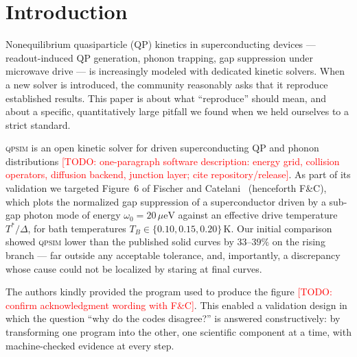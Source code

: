 \documentclass[reprint,amsmath,amssymb,aps,prapplied,nofootinbib]{revtex4-2}
\newcommand{\todo}[1]{\textcolor{red}{[TODO: #1]}}
\newcommand{\qpsim}{\textsc{qpsim}}
\newcommand{\ueV}{\,\mu\mathrm{eV}}
\begin{document}
\maketitle

\section{Introduction}

Nonequilibrium quasiparticle (QP) kinetics in superconducting devices ---
readout-induced QP generation, phonon trapping, gap suppression under
microwave drive --- is increasingly modeled with dedicated kinetic
solvers.  When a new solver is introduced, the community reasonably asks
that it reproduce established results.  This paper is about what
``reproduce'' should mean, and about a specific, quantitatively large
pitfall we found when we held ourselves to a strict standard.

\qpsim{} is an open kinetic solver for driven superconducting QP and
phonon distributions \todo{one-paragraph software description: energy
grid, collision operators, diffusion backend, junction layer; cite
repository/release}.  As part of its validation we targeted Figure~6 of
Fischer and Catelani~\cite{fischer2023} (henceforth F\&C), which plots
the normalized gap suppression of a superconductor driven by a sub-gap
photon mode of energy $\omega_0 = 20\ueV$ against an effective drive
temperature $T^*/\Delta$, for bath temperatures $T_B \in \{0.10, 0.15,
0.20\}\,$K.  Our initial comparison showed \qpsim{} lower than the
published solid curves by $33\text{--}39\%$ on the rising branch --- far
outside any acceptable tolerance, and, importantly, a discrepancy whose
cause could not be localized by staring at final curves.

The authors kindly provided the program used to produce the figure
\todo{confirm acknowledgment wording with F\&C}.  This enabled a
validation design in which the question ``why do the codes disagree?''
is answered constructively: by transforming one program into the other,
one scientific component at a time, with machine-checked evidence at
every step.
\end{document}
